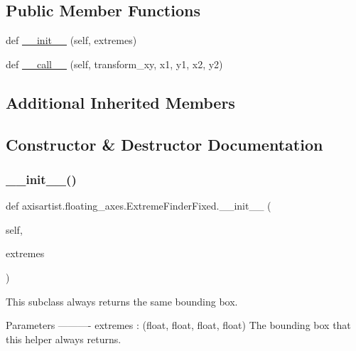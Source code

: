 \subsection*{Public Member Functions}
\begin{DoxyCompactItemize}
\item 
def \hyperlink{classaxisartist_1_1floating__axes_1_1ExtremeFinderFixed_adfbfdda01af4687866e8f957e083ba15}{\+\_\+\+\_\+init\+\_\+\+\_\+} (self, extremes)
\item 
def \hyperlink{classaxisartist_1_1floating__axes_1_1ExtremeFinderFixed_a8c5733026d503d38dd489f3356a72269}{\+\_\+\+\_\+call\+\_\+\+\_\+} (self, transform\+\_\+xy, x1, y1, x2, y2)
\end{DoxyCompactItemize}
\subsection*{Additional Inherited Members}


\subsection{Constructor \& Destructor Documentation}
\mbox{\label{classaxisartist_1_1floating__axes_1_1ExtremeFinderFixed_adfbfdda01af4687866e8f957e083ba15}} 
\subsubsection{\texorpdfstring{\+\_\+\+\_\+init\+\_\+\+\_\+()}{\_\_init\_\_()}}
{\footnotesize\ttfamily def axisartist.\+floating\+\_\+axes.\+Extreme\+Finder\+Fixed.\+\_\+\+\_\+init\+\_\+\+\_\+ (\begin{DoxyParamCaption}\item[{}]{self,  }\item[{}]{extremes }\end{DoxyParamCaption})}

\begin{DoxyVerb}This subclass always returns the same bounding box.

Parameters
----------
extremes : (float, float, float, float)
    The bounding box that this helper always returns.
\end{DoxyVerb}
 

